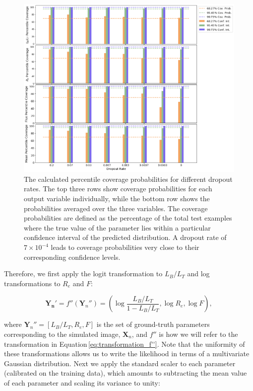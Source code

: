 \begin{figure}[htb]
    \centering
    \includegraphics[width
    =\textwidth]{dropout_calibration_new.png}
    \caption{The calculated percentile coverage probabilities for different dropout rates. The top three rows show coverage probabilities for each output variable individually, while the bottom row shows the probabilities averaged over the three variables. The coverage probabilities are defined as the percentage of the total test examples where the  true  value  of  the  parameter  lies  within  a  particular confidence interval of the predicted distribution. A dropout rate of $7\times10^{-4}$ leads to coverage probabilities very close to their corresponding confidence levels.}
    \label{fig_c2:dropout_calibration}
\end{figure}

Therefore, we first apply the logit transformation to $L_B/L_T$ and log transformations to $R_e$ and $F$: 

\begin{equation}
\boldsymbol{Y_n'} = f''(\boldsymbol{Y}_n'') = \left( \log \frac{L_B/L_T}{1 - L_B/L_T}, \log R_e, \log F \right) ,
\label{eq:transformation_f''}
\end{equation} 

\noindent
where $\boldsymbol{Y}_n'' = [{L_B/L_T,R_e,F}]$ is the set of ground-truth parameters corresponding to the simulated image, $\boldsymbol{X}_n$, and $f''$ is how we will refer to the transformation in Equation\,\ref{eq:transformation_f''}. Note that the uniformity of these transformations allows us to write the likelihood in terms of a multivariate Gaussian distribution. Next we apply the standard scaler to each parameter (calibrated on the training data), which amounts to subtracting the mean value of each parameter and scaling its variance to unity:

